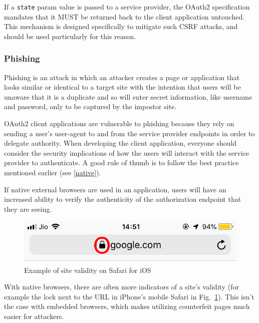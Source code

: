 If a \texttt{state} param value is passed to a service provider, the OAuth2 specification mandates that it MUST be returned back to the client application untouched. This mechanism is designed specifically to mitigate such CSRF attacks, and should be used particularly for this reason.

\subsubsection{Phishing}
Phishing is an attack in which an attacker creates a page or application that looks similar or identical to a target site with the intention that users will be unaware that it is a duplicate and so will enter secret information, like username and password, only to be captured by the impostor site.

OAuth2 client applications are vulnerable to phishing because they rely on sending a user's user-agent to and from the service provider endpoints in order to delegate authority. When developing the client application, everyone should consider the security implications of how the users will interact with the service provider to authenticate. A good rule of thumb is to follow the best practice mentioned earlier (see \ref{native}).

If native external browsers are used in an application, users will have an increased ability to verify the authenticity of the authorization endpoint that they are seeing.

\vspace{1cm}

\begin{figure}[ht]
    \centering
    \includegraphics[scale=0.55]{chapters/images/chp4/oie_toIlpPOFRMdK.png}
    \caption{Example of site validity on Safari for iOS}
    \label{fig:ioslock}
\end{figure}

\vspace{0.5cm}

With native browsers, there are often more indicators of a site's validity (for example the lock next to the URL in iPhone's mobile Safari in Fig.~\ref{fig:ioslock}). This isn't the case with embedded browsers, which makes utilizing counterfeit pages much easier for attackers.

